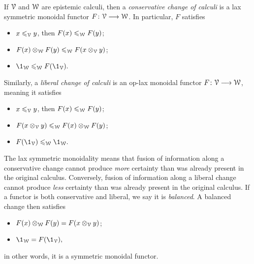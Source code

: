 If $\EuScript{V}$ and $\EuScript{W}$ are epistemic calculi, then a \emph{conservative change of calculi} is a lax symmetric monoidal functor $F\colon \EuScript{V} \longrightarrow \EuScript{W}$. In particular, $F$ satisfies 
\begin{itemize}
    \item $x\leqslant_{\EuScript{V}} y$, then $F(x)\leqslant_{\EuScript{W}} F(y)$;
    \item $F(x)\otimes_{\EuScript{W}} F(y) \leqslant_{\EuScript{W}} F(x\otimes_{\EuScript{V}} y)$;
    \item $\1_\W \leq_\W F(\1_\V).$
\end{itemize}  
Similarly, a \emph{liberal change of calculi} is an op-lax monoidal functor $F\colon \EuScript{V} \longrightarrow \EuScript{W}$, meaning it satisfies 
\begin{itemize}
    \item $x\leqslant_{\EuScript{V}} y$, then $F(x)\leqslant_{\EuScript{W}} F(y)$;
    \item $F(x\otimes_{\EuScript{V}} y) \leqslant_{\EuScript{W}} F(x)\otimes_{\EuScript{W}} F(y)$;
    \item $F(\1_\V) \leq_\W \1_\W.$
\end{itemize}  
The lax symmetric monoidality means that fusion of information along a conservative change cannot produce \emph{more} certainty than was already present in the original calculus. Conversely, fusion of information along a liberal change cannot produce \emph{less} certainty than was already present in the original calculus. If a functor is both conservative and liberal, we say it is \emph{balanced}. A balanced change then satisfies 
\begin{itemize}
    \item $F(x)\otimes_{\EuScript{W}} F(y) = F(x\otimes_{\EuScript{V}} y)$;
    \item $\1_\W = F(\1_\V),$
\end{itemize}  
in other words, it is a symmetric monoidal functor. 




